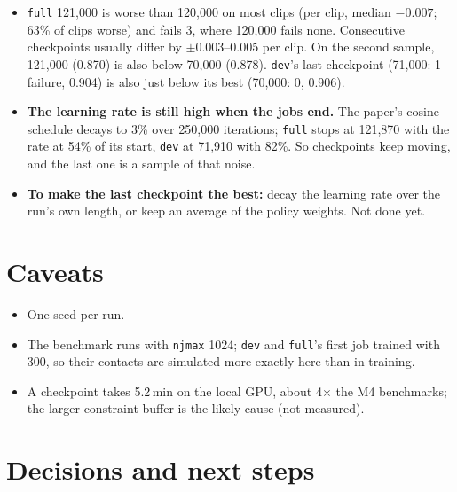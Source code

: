 \documentclass[10pt]{article}
\begin{document}
\begin{itemize}
  \item \texttt{full} 121,000 is worse than 120,000 on most clips (per clip, median $-0.007$; 63\% of clips
  worse) and fails 3, where 120,000 fails none. Consecutive checkpoints usually differ by $\pm$0.003--0.005
  per clip. On the second sample, 121,000 (0.870) is also below 70,000 (0.878). \texttt{dev}'s last
  checkpoint (71,000: 1 failure, 0.904) is also just below its best (70,000: 0, 0.906).
  \item \textbf{The learning rate is still high when the jobs end.} The paper's cosine schedule decays to
  3\% over 250,000 iterations; \texttt{full} stops at 121,870 with the rate at 54\% of its start,
  \texttt{dev} at 71,910 with 82\%. So checkpoints keep moving, and the last one is a sample of that noise.
  \item \textbf{To make the last checkpoint the best:} decay the learning rate over the run's own length,
  or keep an average of the policy weights. Not done yet.
\end{itemize}

\section{Caveats}

\begin{itemize}
  \item One seed per run.
  \item The benchmark runs with \texttt{njmax} 1024; \texttt{dev} and \texttt{full}'s first job trained with
  300, so their contacts are simulated more exactly here than in training.
  \item A checkpoint takes 5.2\,min on the local GPU, about 4$\times$ the M4 benchmarks; the larger constraint
  buffer is the likely cause (not measured).
\end{itemize}

\section{Decisions and next steps}
\end{document}
